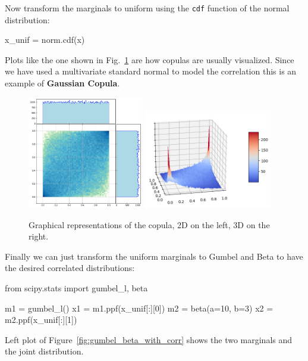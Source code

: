 Now transform the marginals to uniform using the \texttt{cdf} function of the normal distribution:

\begin{ipython}
x_unif = norm.cdf(x)
\end{ipython}

Plots like the one shown in Fig.~\ref{fig:copula} are how copulas are usually visualized. Since we have used a multivariate standard normal to model the correlation this is an example of \textbf{Gaussian Copula}.

\begin{figure}[htbp]
\centering
\includegraphics[width=0.45\textwidth]{figures/copula_2d}
\quad
\includegraphics[width=0.5\textwidth]{figures/copula_3d}
\caption{Graphical representations of the copula, 2D on the left, 3D on the right.}
\label{fig:copula}
\end{figure}

Finally we can just transform the uniform marginals to Gumbel and Beta to have the desired correlated distributions:

\begin{ipython}
from scipy.stats import gumbel_l, beta

m1 = gumbel_l()
x1 = m1.ppf(x_unif[:][0])
m2 = beta(a=10, b=3)
x2 = m2.ppf(x_unif[:][1])
\end{ipython}

Left plot of Figure~\ref{fig:gumbel_beta_with_corr} shows the two marginals and the joint distribution.
    
